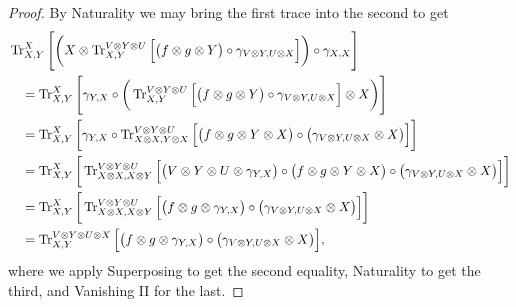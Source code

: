 \documentclass[12pt,oneside,article,draft]{memoir}
\begin{document}
\begin{proof}
 By Naturality we may bring the first trace into the second to get
 \begin{align*}
  &\operatorname{Tr}^X_{X,Y}\Bigg[\bigg(X\otimes \operatorname{Tr}^{V\otimes Y\otimes U}_{X,Y}\Big[\big(f\otimes g\otimes Y\big)\circ\gamma_{V\otimes Y,U\otimes X}\Big]\bigg)\circ\gamma_{X,X}\Bigg]\\
  &\quad=\operatorname{Tr}^X_{X,Y}\Bigg[\gamma_{Y,X}\circ\bigg(\operatorname{Tr}^{V\otimes Y\otimes U}_{X,Y}\Big[\big(f\otimes g\otimes Y\big)\circ\gamma_{V\otimes Y,U\otimes X}\Big]\otimes X\bigg)\Bigg]\\
  &\quad=\operatorname{Tr}^X_{X,Y}\bigg[\gamma_{Y,X}\circ\operatorname{Tr}^{V\otimes Y\otimes U}_{X\otimes X,Y\otimes X}\Big[\big(f\otimes g\otimes Y\otimes X\big)\circ\big(\gamma_{V\otimes Y,U\otimes X}\otimes X\big)\Big]\bigg]\\
  &\quad=\operatorname{Tr}^X_{X,Y}\bigg[\operatorname{Tr}^{V\otimes Y\otimes U}_{X\otimes X,X\otimes Y}\Big[\big(V\otimes Y\otimes U\otimes \gamma_{Y,X}\big)\circ\big(f\otimes g\otimes Y\otimes X\big)\circ\big(\gamma_{V\otimes Y,U\otimes X}\otimes X\big)\Big]\bigg]\\
  &\quad=\operatorname{Tr}^X_{X,Y}\bigg[\operatorname{Tr}^{V\otimes Y\otimes U}_{X\otimes X,X\otimes Y}\Big[\big(f\otimes g\otimes \gamma_{Y,X}\big)\circ\big(\gamma_{V\otimes Y,U\otimes X}\otimes X\big)\Big]\bigg]\\
  &\quad=\operatorname{Tr}^{V\otimes Y\otimes U\otimes X}_{X,Y}\Big[\big(f\otimes g\otimes \gamma_{Y,X}\big)\circ\big(\gamma_{V\otimes Y,U\otimes X}\otimes X\big)\Big],
 \end{align*}
 where we apply Superposing to get the second equality, Naturality to get the third, and Vanishing II for the last.
 

\end{proof}
\end{document}
